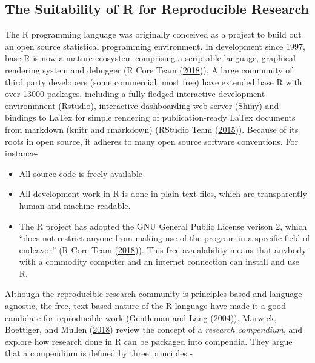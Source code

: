 \documentclass[11pt,preprint, authoryear]{elsarticle}
\numberwithin{equation}{section}
\numberwithin{figure}{section}
\numberwithin{table}{section}
\def\tightlist{} %
\begin{document}
\subsection{The Suitability of R for Reproducible
Research}\label{the-suitability-of-r-for-reproducible-research}

The R programming language was originally conceived as a project to
build out an open source statistical programming environment. In
development since 1997, base R is now a mature ecosystem comprising a
scriptable language, graphical rendering system and debugger (R Core
Team (\protect\hyperlink{ref-RCoreTeam2018}{2018})). A large community
of third party developers (some commercial, most free) have extended
base R with over 13000 packages, including a fully-fledged interactive
development environmnent (Rstudio), interactive dashboarding web server
(Shiny) and bindings to LaTex for simple rendering of publication-ready
LaTex documents from markdown (knitr and rmarkdown) (RStudio Team
(\protect\hyperlink{ref-RStudioTeam2015}{2015})). Because of its roots
in open source, it adheres to many open source software conventions. For
instance-

\begin{itemize}
\tightlist
\item
  All source code is freely available
\item
  All development work in R is done in plain text files, which are
  transparently human and machine readable.
\item
  The R project has adopted the GNU General Public License verison 2,
  which ``does not restrict anyone from making use of the program in a
  specific field of endeavor'' (R Core Team
  (\protect\hyperlink{ref-RCoreTeam2018}{2018})). This free
  avaialability means that anybody with a commodity computer and an
  internet connection can install and use R.
\end{itemize}

Although the reproducible research community is principles-based and
language-agnostic, the free, text-based nature of the R language have
made it a good candidate for reproducible work (Gentleman and Lang
(\protect\hyperlink{ref-Gentleman2004}{2004})). Marwick, Boettiger, and
Mullen (\protect\hyperlink{ref-Marwick2018}{2018}) review the concept of
a \emph{research compendium}, and explore how research done in R can be
packaged into compendia. They argue that a compendium is defined by
three principles -
\end{document}
